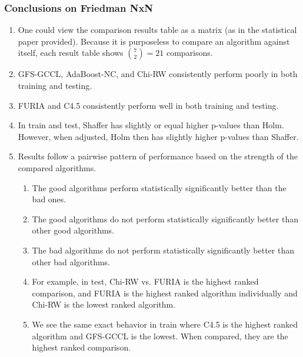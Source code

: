 \documentclass[a4paper,11pt]{article}
\begin{document}
\subsubsection{Conclusions on Friedman NxN}
\begin{enumerate}
\item One could view the comparison results table as a matrix (as in the statistical paper provided). Because it is purposeless to compare an algorithm against itself, each result table shows $\binom{7}{2} = 21$ comparisons.
\item GFS-GCCL, AdaBoost-NC, and Chi-RW consistently perform poorly in both training and testing.
\item FURIA and C4.5 consistently perform well in both training and testing.
\item In train and test, Shaffer has slightly or equal higher p-values than Holm. However, when adjusted, Holm then has slightly higher p-values than Shaffer.
\item Results follow a pairwise pattern of performance based on the strength of the compared algorithms.
\begin{enumerate}
\item The good algorithms perform statistically significantly better than the bad ones.
\item The good algorithms do not perform statistically significantly better than other good algorithms.
\item The bad algorithms do not perform statistically significantly better than other bad algorithms.
\item For example, in test, Chi-RW vs. FURIA is the highest ranked comparison, and FURIA is the highest ranked algorithm individually and Chi-RW is the lowest ranked algorithm.
\item We see the same exact behavior in train where C4.5 is the highest ranked algorithm and GFS-GCCL is the lowest. When compared, they are the highest ranked comparison.
\end{enumerate}
\end{enumerate}
\end{document}
